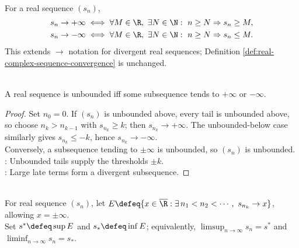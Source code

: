 \begin{definition} \label{def:sequence-diverges-to-infinity} \\
For a real sequence $(s_n)$,
\begin{align}
s_n\to+\infty &\iff \forall M\in\R,\ \exists N\in\N:\ n\geq N\Rightarrow s_n\geq M, \nonumber\\
s_n\to-\infty &\iff \forall M\in\R,\ \exists N\in\N:\ n\geq N\Rightarrow s_n\leq M. \nonumber
\end{align}
This extends $\to$ notation for divergent real sequences; Definition \ref{def:real-complex-sequence-convergence} is unchanged.
\end{definition}

\begin{proposition} \label{prop:unbounded-real-sequence-has-infinite-subsequence} \\
A real sequence is unbounded iff some subsequence tends to $+\infty$ or $-\infty$.
\begin{proof}
Set $n_0=0$. If $(s_n)$ is unbounded above, every tail is unbounded above, so choose $n_k>n_{k-1}$ with $s_{n_k}\geq k$; then $s_{n_k}\to+\infty$. The unbounded-below case similarly gives $s_{n_k}\leq-k$, hence $s_{n_k}\to-\infty$.\\
Conversely, a subsequence tending to $\pm\infty$ is unbounded, so $(s_n)$ is unbounded.\\
: Unbounded tails supply the thresholds $\pm k$.\\
: Large late terms form a divergent subsequence.
\end{proof}
\end{proposition}

\begin{definition} \label{def:upper-and-lower-limits} \\
For real sequence $(s_n)$, let $E\defeq\{x\in\overline{\R}:\exists\, n_1<n_2<\cdots,\ s_{n_k}\to x\}$, allowing $x=\pm\infty$.\\
Set $s^*\defeq\sup E$ and $s_*\defeq\inf E$; equivalently, $\limsup_{n\to\infty}s_n=s^*$ and $\liminf_{n\to\infty}s_n=s_*$.
\end{definition}

